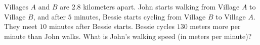 Villages $A$ and $B$ are $2.8$ kilometers apart. John starts walking from Village $A$ to Village $B$, and after $5$ minutes, Bessie starts cycling from Village $B$ to Village $A$. They meet $10$ minutes after Bessie starts. Bessie cycles $130$ meters more per minute than John walks. What is John's walking speed (in meters per minute)?
